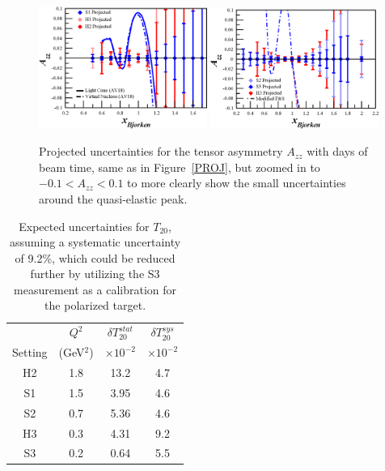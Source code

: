 \begin{figure}
\begin{center}
\includegraphics[width=0.49\textwidth]{figs/Azz_S1_H1_H2_zoom.eps} 
\includegraphics[width=0.49\textwidth]{figs/Azz_S2_H3_S3_zoom.eps} 
\caption{\label{PROJ-zoom}Projected uncertainties for the tensor asymmetry $A_{zz}$ with \productiondays days of beam time, same as in Figure~\ref{PROJ}, but zoomed in to $-0.1<A_{zz}<0.1$ to more clearly show the small uncertainties around the quasi-elastic peak.
}
\end{center}
\end{figure}

\begin{table}
\begin{center}
\begin{tabular}{c|c|c|c}
		& $Q^2$    	& $\delta T_{20}^{stat}$	&  $\delta T_{20}^{sys}$ \\
Setting	& (GeV$^2$)	& $\times 10^{-2}$		& $\times 10^{-2}$ \\
\hline\hline
H2 		& 1.8		&  13.2					& 4.7 \\  
S1 		& 1.5		&  3.95					& 4.6 \\
S2 		& 0.7		&  5.36					& 4.6 \\  
H3 		& 0.3		&  4.31					& 9.2 \\  
S3 		& 0.2		&  0.64					& 5.5 \\
  
\hline\hline
\end{tabular}
\caption{\label{RATES-T20}Expected uncertainties for $T_{20}$, assuming a systematic uncertainty of 9.2\%, which could be reduced further by utilizing the S3 measurement as a calibration for the polarized target.}
\end{center}
\end{table}

